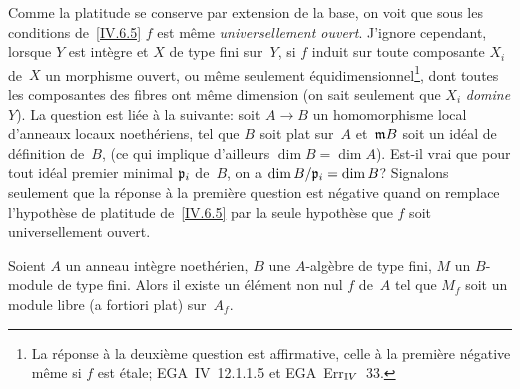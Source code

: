 \begin{remarquesstar}
Comme la platitude se conserve par extension de la base, on voit que
sous les conditions de~\ref{IV.6.5} $f$ est m\^eme
\emph{universellement ouvert}. J'ignore cependant, lorsque $Y$ est
int\`egre et $X$ de type fini sur~$Y$, si $f$ induit sur toute
composante $X_i$ de~$X$ un morphisme ouvert, ou m\^eme seulement
\'equidimensionnel\footnote{La r\'eponse \`a la deuxi\`eme question est
affirmative, celle \`a la premi\`ere n\'egative m\^eme si $f$
est \'etale; \cf EGA~IV~12.1.1.5 et EGA~Err$_{\rm IV}$~33.},
\ie
dont toutes les composantes des fibres ont m\^eme dimension (on sait
seulement que $X_i$ \emph{domine} $Y$). La question est li\'ee
\`a la suivante: soit $A\to B$ un homomorphisme local d'anneaux
locaux noeth\'eriens, tel que $B$ soit plat sur~$A$ et~$\goth{m}B$
soit un id\'eal de d\'efinition de~$B$, (ce qui implique
d'ailleurs $\dim B=\dim A$). Est-il vrai que pour tout id\'eal
premier minimal $\goth{p}_i$ de~$B$, on a $\dim B/\goth{p}_i=\dim B$?
Signalons seulement que la r\'eponse \`a la premi\`ere question
est n\'egative quand on remplace l'hypoth\`ese de platitude
de~\ref{IV.6.5} par la seule hypoth\`ese que $f$ soit
universellement ouvert.
\end{remarquesstar}

\begin{lemme}
\label{IV.6.7}
Soient $A$ un anneau int\`egre noeth\'erien, $B$ une
$A$-alg\`ebre de type fini, $M$ un $B$-module de type fini. Alors
il existe un \'el\'ement non nul $f$ de~$A$ tel que $M_f$ soit un
module libre (a fortiori plat) sur~$A_f$.
\end{lemme}

